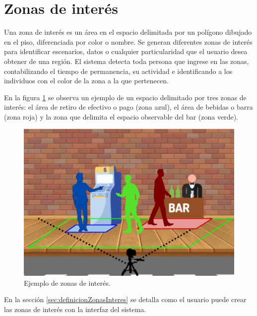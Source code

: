 \newpage

\section{Zonas de interés}
\label{sec:zonasInteres}

Una zona de interés es un área en el espacio delimitada por un polígono dibujado en el piso, diferenciada por color o nombre. Se generan diferentes zonas de interés para identificar escenarios, datos o cualquier particularidad que el usuario desea obtener de una región. El sistema detecta toda persona que ingrese en las zonas, contabilizando el tiempo de permanencia, su actividad e identificando a los individuos con el color de la zona a la que pertenecen.

En la figura \ref{fig:zonasInteres} se observa un ejemplo de un espacio delimitado por tres zonas de interés: el área de retiro de efectivo o pago (zona azul), el área de bebidas o barra (zona roja) y la zona que delimita el espacio observable del bar (zona verde).

\begin{figure}[ht]
	\centering
	\includegraphics[scale=1.2]{./Figures/zonasInteres.jpg}
	\caption{Ejemplo de zonas de interés.}
	\label{fig:zonasInteres}
\end{figure}

En la sección \ref{sec:definicionZonasInteres} se detalla como el usuario puede crear las zonas de interés con la interfaz del sistema.